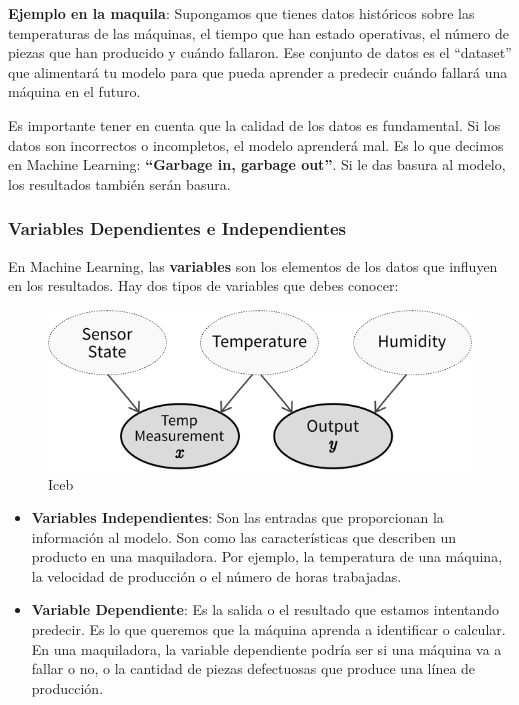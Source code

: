 \documentclass[
  10pt,
  letterpaper,
]{book}
\begin{document}
\textbf{Ejemplo en la maquila}: Supongamos que tienes datos históricos
sobre las temperaturas de las máquinas, el tiempo que han estado
operativas, el número de piezas que han producido y cuándo fallaron. Ese
conjunto de datos es el ``dataset'' que alimentará tu modelo para que
pueda aprender a predecir cuándo fallará una máquina en el futuro.

Es importante tener en cuenta que la calidad de los datos es
fundamental. Si los datos son incorrectos o incompletos, el modelo
aprenderá mal. Es lo que decimos en Machine Learning: \textbf{``Garbage
in, garbage out''}. Si le das basura al modelo, los resultados también
serán basura.

\subsubsection{\texorpdfstring{\textbf{Variables Dependientes e
Independientes}}{Variables Dependientes e Independientes}}\label{variables-dependientes-e-independientes}

En Machine Learning, las \textbf{variables} son los elementos de los
datos que influyen en los resultados. Hay dos tipos de variables que
debes conocer:

\begin{figure}[H]

{\centering \includegraphics{Img/imagen_157.jpg}

}

\caption{Iceb}

\end{figure}%

\begin{itemize}
\item
  \textbf{Variables Independientes}: Son las entradas que proporcionan
  la información al modelo. Son como las características que describen
  un producto en una maquiladora. Por ejemplo, la temperatura de una
  máquina, la velocidad de producción o el número de horas trabajadas.
\item
  \textbf{Variable Dependiente}: Es la salida o el resultado que estamos
  intentando predecir. Es lo que queremos que la máquina aprenda a
  identificar o calcular. En una maquiladora, la variable dependiente
  podría ser si una máquina va a fallar o no, o la cantidad de piezas
  defectuosas que produce una línea de producción.
\end{itemize}
\end{document}
